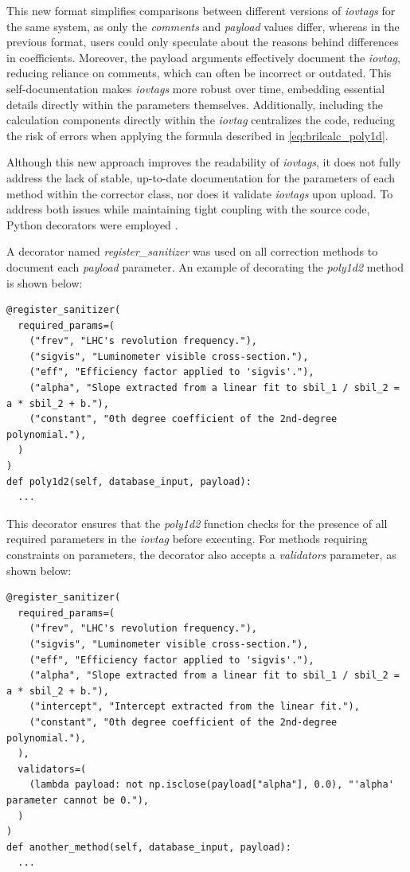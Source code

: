 This new format simplifies comparisons between different versions of \textit{iovtags} for the same system, as only the \textit{comments} and \textit{payload} values differ, whereas in the previous format, users could only speculate about the reasons behind differences in coefficients. Moreover, the payload arguments effectively document the \textit{iovtag}, reducing reliance on comments, which can often be incorrect or outdated. This self-documentation makes \textit{iovtags} more robust over time, embedding essential details directly within the parameters themselves. Additionally, including the calculation components directly within the \textit{iovtag} centralizes the code, reducing the risk of errors when applying the formula described in \autoref{eq:brilcalc_poly1d}.

Although this new approach improves the readability of \textit{iovtags}, it does not fully address the lack of stable, up-to-date documentation for the parameters of each method within the corrector class, nor does it validate \textit{iovtags} upon upload. To address both issues while maintaining tight coupling with the source code, Python decorators were employed \cite{pep318}.

A decorator named \textit{register\_sanitizer} was used on all correction methods to document each \textit{payload} parameter. An example of decorating the \textit{poly1d2} method is shown below:

\begin{lstlisting}
@register_sanitizer(
  required_params=(
    ("frev", "LHC's revolution frequency."),
    ("sigvis", "Luminometer visible cross-section."),
    ("eff", "Efficiency factor applied to 'sigvis'."),
    ("alpha", "Slope extracted from a linear fit to sbil_1 / sbil_2 = a * sbil_2 + b."),
    ("constant", "0th degree coefficient of the 2nd-degree polynomial."),
  )
)
def poly1d2(self, database_input, payload):
  ...
\end{lstlisting}

This decorator ensures that the \textit{poly1d2} function checks for the presence of all required parameters in the \textit{iovtag} before executing. For methods requiring constraints on parameters, the decorator also accepts a \textit{validators} parameter, as shown below:

\begin{lstlisting}
@register_sanitizer(
  required_params=(
    ("frev", "LHC's revolution frequency."),
    ("sigvis", "Luminometer visible cross-section."),
    ("eff", "Efficiency factor applied to 'sigvis'."),
    ("alpha", "Slope extracted from a linear fit to sbil_1 / sbil_2 = a * sbil_2 + b."),
    ("intercept", "Intercept extracted from the linear fit."),
    ("constant", "0th degree coefficient of the 2nd-degree polynomial."),
  ),
  validators=(
    (lambda payload: not np.isclose(payload["alpha"], 0.0), "'alpha' parameter cannot be 0."),
  )
)
def another_method(self, database_input, payload):
  ...
\end{lstlisting}

